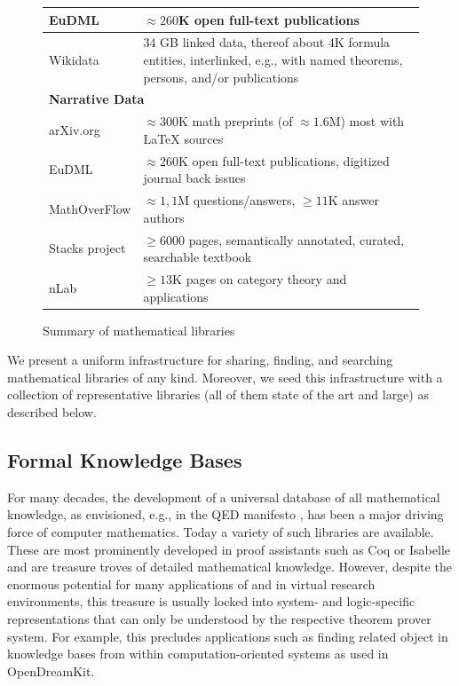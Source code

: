 \begin{figure}[htp]
\begin{tabular}{| p{} | p{}|}
  EuDML  \cite{EuDML:on} & $\approx 260$K open full-text publications \\\hline
  Wikidata  \cite{wikidata:on} & $34$ GB linked data, thereof about $4$K formula entities, interlinked, e.g., with named theorems, persons, and/or publications \\\hline
  \multicolumn{2}{|l|}{\textbf{Narrative Data}} \\\hline
  arXiv.org & $\approx 300$K math preprints (of $\approx1.6$M) most with {\LaTeX} sources\\\hline
  EuDML  \cite{EuDML:on} & $\approx 260$K open full-text publications, digitized journal back issues \\\hline
  MathOverFlow & $\approx 1,1$M questions/answers, $\geq11$K answer authors \\\hline
  Stacks project & $\geq 6000$ pages, semantically annotated, curated, searchable textbook \\\hline
  nLab & $\geq 13$K pages on category theory and applications\\\hline
\end{tabular}
  \caption{Summary of mathematical libraries}\label{fig:datasets}
\end{figure}


We present a uniform infrastructure for sharing, finding, and searching mathematical libraries of any kind.
Moreover, we seed this infrastructure with a collection of representative libraries (all of them state of the art and large) as described below.

\subsection{Formal Knowledge Bases}\label{sec:isabelle}
For many decades, the development of a universal database of all mathematical knowledge, as envisioned, e.g., in the QED manifesto \cite{qed}, has been a major driving force of computer mathematics.
Today a variety of such libraries are available.
These are most prominently developed in proof assistants such as Coq \cite{coq} or Isabelle \cite{isabelle} and are treasure troves of detailed mathematical knowledge.
However, despite the enormous potential for many applications of and in virtual research environments, this treasure is usually locked into system- and logic-specific representations that can only be understood by the respective theorem prover system.
For example, this precludes applications such as finding related object in knowledge bases from within computation-oriented systems as used in OpenDreamKit.

